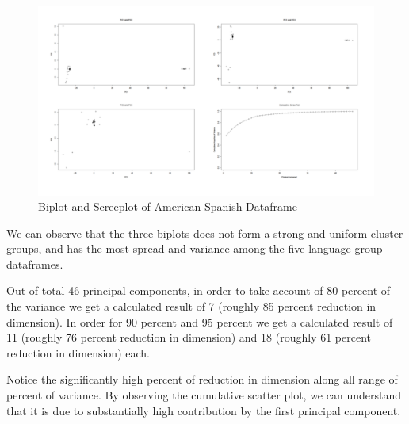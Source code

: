 \begin{figure}[H]
    \centering
    \includegraphics[width=15cm]{images/PCA/4plotSA.png}
    \caption{Biplot and Screeplot of American Spanish Dataframe}
    \label{fig:4plotSA} 
\end{figure}

We can observe that the three biplots does not form a strong and uniform cluster groups, and has the most spread and variance among the five language group dataframes.

Out of total 46 principal components, in order to take account of 80 percent of the variance we get a calculated result of 7 (roughly 85 percent reduction in dimension). In order for 90 percent and 95 percent we get a calculated result of 11 (roughly 76 percent reduction in dimension) and 18 (roughly 61 percent reduction in dimension) each. 

Notice the significantly high percent of reduction in dimension along all range of percent of variance. By observing the cumulative scatter plot, we can understand that it is due to substantially high contribution by the first principal component.